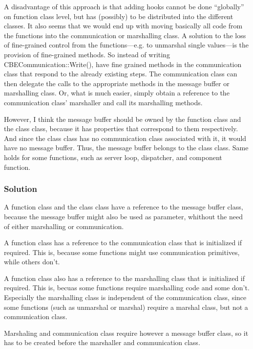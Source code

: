 A disadvantage of this approach is that adding hooks cannot be done
``globally'' on function class level, but has (possibly) to be distributed
into the different classes.  It also seems that we would end up with moving
basically all code from the functions into the communication or marshalling
class.  A solution to the loss of fine-grained control from the
functions---e.g. to unmarshal single values---is the provision of fine-grained
methods.  So instead of writing CBECommunication::Write(), have fine grained
methods in the communication class that respond to the already existing steps.
The communication class can then delegate the calls to the appropriate methods
in the message buffer or marshalling class.  Or, what is much easier, simply
obtain a reference to the communication class' marshaller and call its
marshalling methods.

However, I think the message buffer should be owned by the function class and
the class class, because it has properties that correspond to them
respectively.  And since the class class has no communication class associated
with it, it would have no message buffer.  Thus, the message buffer belongs to
the class class.  Same holds for some functions, such as server loop,
dispatcher, and component function.

\subsubsection{Solution}

A function class and the class class have a reference to the message buffer
class, because the message buffer might also be used as parameter, whithout
the need of either marshalling or communication.

A function class has a reference to the communication class that is
initialized if required.  This is, because some functions might use
communication primitives, while others don't.

A function class also has a reference to the marshalling class that is
initialized if required.  This is, becuas some functions require marshalling
code and some don't.  Especially the marshalling class is independent of the
communication class, since some functions (such as unmarshal or marshal)
require a marshal class, but not a communication class.

Marshaling and communication class require however a message buffer class, so
it has to be created before the marshaller and communication class.
